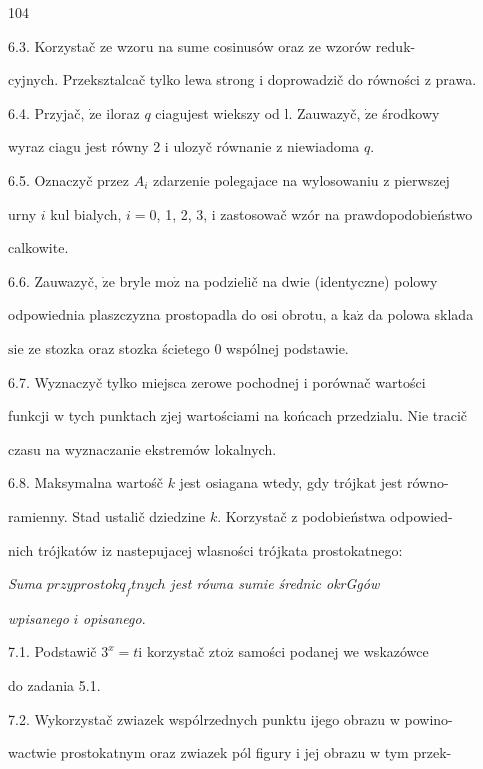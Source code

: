 \documentclass[a4paper,12pt]{article}
\begin{document}
104

6.3. Korzystač ze wzoru na sume cosinusów oraz ze wzorów reduk-

cyjnych. Przeksztalcač tylko lewa strong $\mathrm{i}$ doprowadzič do równości $\mathrm{z}$ prawa.

6.4. Przyjač, $\dot{\mathrm{z}}\mathrm{e}$ iloraz $q$ ciagujest wiekszy od l. Zauwazyč, $\dot{\mathrm{z}}\mathrm{e}$ środkowy

wyraz ciagu jest równy 2 $\mathrm{i}$ ulozyč równanie $\mathrm{z}$ niewiadoma $q.$

6.5. Oznaczyč przez $A_{i}$ zdarzenie polegajace na wylosowaniu $\mathrm{z}$ pierwszej

urny $i$ kul bialych, $i=0$, 1, 2, 3, $\mathrm{i}$ zastosowač wzór na prawdopodobieństwo

calkowite.

6.6. Zauwazyč, $\dot{\mathrm{z}}\mathrm{e}$ bryle $\mathrm{m}\mathrm{o}\dot{\mathrm{z}}$ na podzielič na dwie (identyczne) polowy

odpowiednia plaszczyzna prostopadla do osi obrotu, a $\mathrm{k}\mathrm{a}\dot{\mathrm{z}}$ da polowa sklada

$\mathrm{s}\mathrm{i}\mathrm{e}$ ze stozka oraz stozka ścietego $0$ wspólnej podstawie.

6.7. Wyznaczyč tylko miejsca zerowe pochodnej $\mathrm{i}$ porównač wartości

funkcji $\mathrm{w}$ tych punktach zjej wartościami na końcach przedzialu. Nie tracič

czasu na wyznaczanie ekstremów lokalnych.

6.8. Maksymalna wartośč $k$ jest osiagana wtedy, gdy trójkat jest równo-

ramienny. Stad ustalič dziedzine $k$. Korzystač $\mathrm{z}$ podobieństwa odpowied-

nich trójkatów $\mathrm{i}\mathrm{z}$ nastepujacej wlasności trójkata prostokatnego:

{\it Suma} $przyprostokq_{f}tnych$ {\it jest równa sumie średnic okrGgów}

{\it wpisanego} $i$ {\it opisanego}.

7.1. Podstawič $3^{x}=t\mathrm{i}$ korzystač $\mathrm{z}\mathrm{t}\mathrm{o}\dot{\mathrm{z}}$ samości podanej we wskazówce

do zadania 5.1.

7.2. Wykorzystač zwiazek wspólrzednych punktu ijego obrazu w powino-

wactwie prostokatnym oraz zwiazek pól figury i jej obrazu w tym przek-
\end{document}
